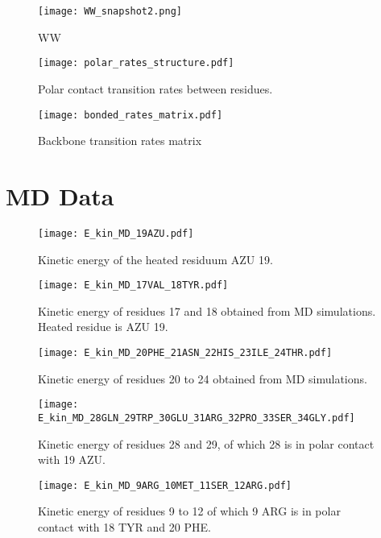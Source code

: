 \documentclass[11pt, a4paper]{report}
\begin{document}
\begin{figure}[h]
  \centering
  \texttt{[image: WW\_snapshot2.png]}
  \caption{WW}
  \label{fig:WW_snapshot2}
\end{figure}

\begin{figure}[h]
  \centering
  \texttt{[image: polar\_rates\_structure.pdf]}
  \caption{Polar contact transition rates between residues.}
  \label{fig:polar_rates_matrix}
\end{figure}

\begin{figure}[h]
  \centering
  \texttt{[image: bonded\_rates\_matrix.pdf]}
  \caption{Backbone transition rates matrix}
  \label{fig:bonded_rates_matrix}
\end{figure}


\section*{MD Data}
\begin{figure}[h]
  \centering
  \texttt{[image: E\_kin\_MD\_19AZU.pdf]}
  \caption{Kinetic energy of the heated residuum AZU 19.}
  \label{fig:E_kin_MD_19}
\end{figure}


\begin{figure}[h]
  \centering
  \texttt{[image: E\_kin\_MD\_17VAL\_18TYR.pdf]}
  \caption{Kinetic energy of residues 17 and 18 obtained from MD simulations. Heated residue is AZU 19.}
  \label{fig:E_kin_MD_15_16_17_18}
\end{figure}

\begin{figure}[h]
  \centering
  \texttt{[image: E\_kin\_MD\_20PHE\_21ASN\_22HIS\_23ILE\_24THR.pdf]}
  \caption{Kinetic energy of residues 20 to 24 obtained from MD simulations.}
  \label{fig:E_kin_MD_20_21_22_23}
\end{figure}


\begin{figure}[h]
  \centering
  \texttt{[image: E\_kin\_MD\_28GLN\_29TRP\_30GLU\_31ARG\_32PRO\_33SER\_34GLY.pdf]}
  \caption{Kinetic energy of residues 28 and 29, of which 28 is in polar contact with 19 AZU.}
  \label{fig:E_kin_MD_28GLN_29TRP_30GLU_31ARG_32PRO_33SER_34GLY}
\end{figure}

\begin{figure}[h]
  \centering
  \texttt{[image: E\_kin\_MD\_9ARG\_10MET\_11SER\_12ARG.pdf]}
  \caption{Kinetic energy of residues 9 to 12 of which 9 ARG is in polar contact with 18 TYR and 20 PHE. }
  \label{fig:E_kin_MEQ_9ARG_10MET_11SER_12ARG}
\end{figure}
\end{document}
